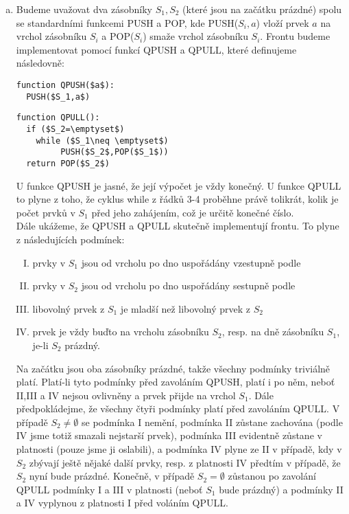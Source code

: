 \documentclass[12pt,a4paper]{article}
\theoremstyle{plain}
\begin{document}
\begin{enumerate}[a)]
\item
Budeme uvažovat dva zásobníky $S_1,S_2$ (které jsou na začátku prázdné) spolu se standardními funkcemi PUSH a POP, kde PUSH($S_i,a$) vloží prvek $a$ na vrchol zásobníku $S_i$ a POP($S_i$) smaže vrchol zásobníku $S_i$. Frontu budeme implementovat pomocí funkcí QPUSH a QPULL, které definujeme následovně:

\begin{lstlisting}[mathescape]
function QPUSH($a$):
  PUSH($S_1,a$)
\end{lstlisting}

\begin{lstlisting}[mathescape]
function QPULL():
  if ($S_2=\emptyset$) 
    while ($S_1\neq \emptyset$)
         PUSH($S_2$,POP($S_1$))
  return POP($S_2$)
\end{lstlisting}

U funkce QPUSH je jasné, že její výpočet je vždy konečný. U funkce QPULL to plyne z toho, že cyklus while z řádků 3-4 proběhne právě tolikrát, kolik je počet prvků v $S_1$ před jeho zahájením, což je určitě konečné číslo.\\

Dále ukážeme, že QPUSH a QPULL skutečně implementují frontu. To plyne z následujících podmínek:
\begin{enumerate}[I.]
\item prvky v $S_1$ jsou od vrcholu po dno uspořádány vzestupně podle 
\item prvky v $S_2$ jsou od vrcholu po dno uspořádány sestupně podle 
\item libovolný prvek z $S_1$ je mladší než libovolný prvek z $S_2$
\item {} prvek je vždy buďto na vrcholu zásobníku $S_2$, resp. na dně zásobníku
 $S_1$, je-li $S_2$ prázdný.
\end{enumerate}
Na začátku jsou oba zásobníky prázdné, takže všechny podmínky triviálně platí. Platí-li tyto podmínky před zavoláním QPUSH, platí i po něm, neboť II,III a IV nejsou ovlivněny a  prvek přijde na vrchol $S_1$. Dále předpokládejme, že všechny čtyři podmínky platí před zavoláním QPULL. V případě $S_2\neq\emptyset$ se podmínka I nemění, podmínka II zůstane zachována (podle IV jsme totiž smazali nejstarší prvek), podmínka III evidentně zůstane v platnosti (pouze jsme ji oslabili), a podmínka IV plyne ze II v případě, kdy v $S_2$ zbývají ještě nějaké další prvky, resp. z platnosti IV předtím v případě, že $S_2$ nyní bude prázdné. Konečně, v případě $S_2=\emptyset$ zůstanou po zavolání QPULL podmínky I a III v platnosti (neboť $S_1$ bude prázdný) a podmínky II a IV vyplynou z platnosti I před voláním QPULL.


\end{enumerate}
\end{document}
